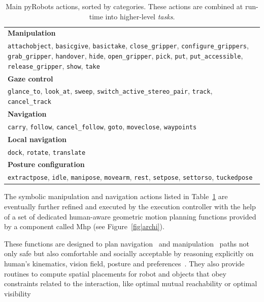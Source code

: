 \documentclass[preprint,3p,times]{elsarticle}
\begin{document}
\begin{table}[ht!]
\begin{center}
\begin{tabular}{p{}}
\hline
    {\bf Manipulation} \\
     {\tt attachobject}, {\tt basicgive}, {\tt basictake}, {\tt close\_gripper}, {\tt configure\_grippers}, {\tt grab\_gripper}, {\tt handover}, {\tt hide}, {\tt open\_gripper}, {\tt pick}, {\tt put}, {\tt put\_accessible}, {\tt release\_gripper}, {\tt show}, {\tt take} \\
\hline
    {\bf Gaze control} \\
     {\tt glance\_to}, {\tt look\_at}, {\tt sweep}, {\tt switch\_active\_stereo\_pair}, {\tt track}, {\tt cancel\_track} \\
\hline
    {\bf Navigation} \\
     {\tt carry}, {\tt follow}, {\tt cancel\_follow}, {\tt goto}, {\tt moveclose}, {\tt waypoints} \\
\hline
    {\bf Local navigation} \\
     {\tt dock}, {\tt rotate}, {\tt translate} \\
\hline
    {\bf Posture configuration} \\
     {\tt extractpose}, {\tt idle}, {\tt manipose}, {\tt movearm}, {\tt rest}, {\tt setpose}, {\tt settorso}, {\tt tuckedpose} \\
\hline
\end{tabular}
\end{center}
\caption{Main {\sc pyRobots} actions, sorted by categories. These
actions are combined at run-time into higher-level \emph{tasks}.}

\label{table|pyrobots_actions}
\end{table}



The symbolic manipulation and navigation actions listed in
Table~\ref{table|pyrobots_actions} are eventually further refined and executed by the execution
controller with the help of a set of dedicated human-aware geometric motion
planning functions provided by a component called {\sc Mhp} (see Figure~\ref{fig|archi}).

These functions are designed to plan navigation~\cite{Sisbot2007} and
manipulation~\cite{Mainprice2011,sisbot2012human} paths not only safe but also
comfortable and socially acceptable by reasoning explicitly on human’s
kinematics, vision field, posture and
preferences~\cite{Madhava2006,kruse2013human,Rios-MartinezSL15}. They also
provide routines to compute spatial placements for robot and objects that obey
constraints related to the interaction, like optimal mutual reachability
or optimal visibility~\cite{Pandey2011} 
\end{document}

